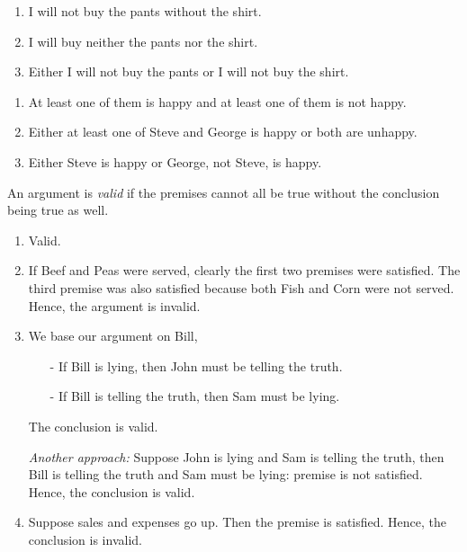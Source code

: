 \begin{exx}
  \begin{enumerate}[label=(\alph*)]
    \item I will not buy the pants without the shirt.
    \item I will buy neither the pants nor the shirt.
    \item Either I will not buy the pants or I will not buy the shirt.
  \end{enumerate}
\end{exx}

\begin{exx}
  \begin{enumerate}[label=(\alph*)]
    \item At least one of them is happy and at least one of them is not happy.
    \item Either at least one of Steve and George is happy or both are unhappy.
    \item Either Steve is happy or George, not Steve, is happy.
  \end{enumerate}
\end{exx}

\begin{exx}
  \begin{cd}
    An argument is \emph{valid} if the premises cannot all be true without the conclusion
    being true as well.
  \end{cd}
  \begin{enumerate}[label=(\alph*)]
    \item Valid.
    \item If Beef and Peas were served, clearly the first two premises were satisfied.
    The third premise was also satisfied because both Fish and Corn were not served. Hence,
    the argument is invalid.
    \item We base our argument on Bill,
    \begin{enumerate}
      \item[-] If Bill is lying, then John must be telling the truth.
      \item[-] If Bill is telling the truth, then Sam must be lying.
    \end{enumerate}
    The conclusion is valid. \par
    \emph{Another approach:} Suppose John is lying and Sam is telling the truth, then Bill is
    telling the truth and Sam must be lying: premise is not satisfied. Hence, the conclusion
    is valid.
    \item Suppose sales and expenses go up. Then the premise is satisfied. Hence,
    the conclusion is invalid.
  \end{enumerate}
\end{exx}
